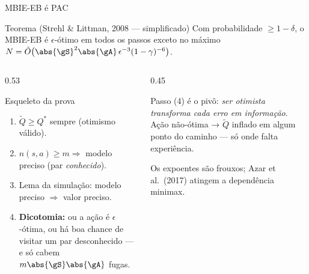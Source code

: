 \documentclass[aspectratio=169, 11pt]{beamer}
\newcommand{\Qtil}{\widetilde{Q}}
\newcommand{\Qstar}{Q^{*}}
\begin{document}
\begin{frame}{MBIE-EB é PAC}
  \begin{teobox}{Teorema (Strehl \& Littman, 2008 --- simplificado)}
    Com probabilidade $\ge 1-\delta$, o MBIE-EB é $\epsilon$-ótimo em todos os passos
    exceto no máximo
    $N = \tilde{O}\bigl(\abs{\gS}^{2}\abs{\gA}\,\epsilon^{-3}(1-\gamma)^{-6}\bigr)$.
  \end{teobox}
  \begin{columns}[T]
    \begin{column}{0.53\textwidth}
      \begin{defbox}{Esqueleto da prova}
        \begin{enumerate}
          \item $\Qtil \ge \Qstar$ sempre (otimismo válido).
          \item $n(s,a)\ge m \Rightarrow$ modelo preciso (par \emph{conhecido}).
          \item Lema da simulação: modelo preciso $\Rightarrow$ valor preciso.
          \item \textbf{Dicotomia:} ou a ação é $\epsilon$-ótima, ou há boa chance de
                visitar um par desconhecido --- e só cabem $m\abs{\gS}\abs{\gA}$ fugas.
        \end{enumerate}
      \end{defbox}
    \end{column}
    \begin{column}{0.45\textwidth}
      \begin{ideiabox}
        Passo (4) é o pivô: \emph{ser otimista transforma cada erro em informação}.
        Ação não-ótima → $\Qtil$ inflado em algum ponto do caminho --- só onde
        falta experiência.
      \end{ideiabox}
      \begin{alertabox}
        Os expoentes são frouxos; Azar et al.\ (2017) atingem a dependência minimax.
      \end{alertabox}
    \end{column}
  \end{columns}
\end{frame}
\end{document}
